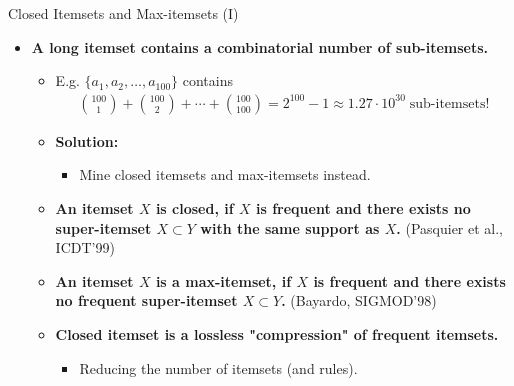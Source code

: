 \begin{frame}{Closed Itemsets and Max-itemsets (I)}
	\begin{itemize}
		\item \textbf{A long itemset contains a combinatorial number of
			      sub-itemsets.}
		      \begin{itemize}
			      \item E.g. $\{a_1,a_2,\ldots,a_{100}\}$ contains
			            \begin{align*}
				            {100\choose 1} + {100 \choose 2} + \cdots + {100 \choose 100} =
				            2^{100}-1 \approx 1.27 \cdot 10^{30} \; \text{sub-itemsets!}
			            \end{align*}
			      \item \textbf{Solution:}
			            \begin{itemize}
				            \item Mine closed itemsets and max-itemsets instead.
			            \end{itemize}
			      \item \textbf{An itemset $X$ is closed, if $X$ is frequent and
				            there exists no super-itemset $X \subset Y$ with the same support
				            as $X$.} (Pasquier et al., ICDT'99)
			      \item \textbf{An itemset $X$ is a max-itemset, if $X$ is frequent
				            and there exists no frequent super-itemset $X \subset Y$.}
			            (Bayardo, SIGMOD'98)
			      \item \textbf{Closed itemset is a lossless "compression" of
				            frequent itemsets.}
			            \begin{itemize}
				            \item Reducing the number of itemsets (and rules).
			            \end{itemize}
		      \end{itemize}
	\end{itemize}
\end{frame}

